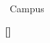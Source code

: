 \vspace{1.5\baselineskip}
\begin{center}
\begin{minipage}[t]{0.47\textwidth}
\DashedSignatureLine{5cm}\\
\HeadOfDepartment \\
\HeadOfDepartmentTitle\\
\CampusName\ Campus\\
\UniversityName
\end{minipage}
\end{center}

\vfill
\begin{center}
\textbf{[\SubmissionDate]}
\end{center}
